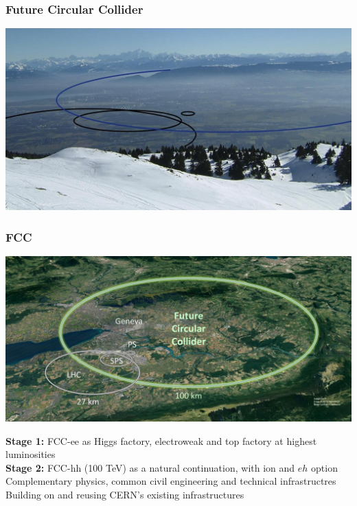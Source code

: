 \documentclass[aspectratio=169]{beamer}
\newcommand{\bluetext}[1]{%
  \textcolor{myBlue}{#1}
}
\begin{document}
\begin{frame}
  \frametitle{Future Circular Collider}
  \includegraphics[width=1.0\linewidth]{figures/FCC_landscape.jpg}\\
\end{frame}
  
\begin{frame}
  \frametitle{FCC}

  \begin{center}
     \includegraphics[width=0.6\linewidth]{figures/CERN-FCC.jpg}\\
  \end{center}
  
  \bluetext{{\bf Stage 1:} FCC-ee as Higgs factory, electroweak and top factory at highest luminosities}\\
  \bluetext{{\bf Stage 2:} FCC-hh (100 TeV) as a natural continuation, with ion and $eh$ option}\\
Complementary physics, common civil engineering and technical infrastructres\\
Building on and reusing CERN’s existing infrastructures\\

\end{frame}
\end{document}
